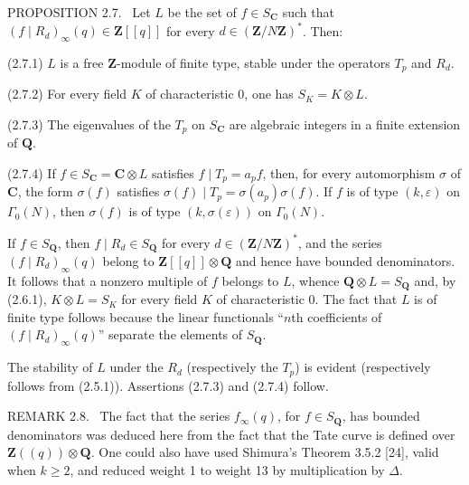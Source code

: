 \documentclass[10pt,oneside]{article}
\begin{document}
\noindent\textsc{PROPOSITION 2.7.} \textemdash\ Let \(L\) be the set of \(f\in S_{\mathbf{C}}\) such that \((f\mid R_d)_\infty(q)\in\mathbf{Z}[[q]]\) for every \(d\in(\mathbf{Z}/N\mathbf{Z})^*\). Then:\par

(2.7.1) \(L\) is a free \(\mathbf{Z}\)-module of finite type, stable under the operators \(T_p\) and \(R_d\).\par

(2.7.2) For every field \(K\) of characteristic 0, one has \(S_K=K\otimes L\).\par

(2.7.3) The eigenvalues of the \(T_p\) on \(S_{\mathbf{C}}\) are algebraic integers in a finite extension of \(\mathbf{Q}\).\par

(2.7.4) If \(f\in S_{\mathbf{C}}=\mathbf{C}\otimes L\) satisfies \(f\mid T_p=a_pf\), then, for every automorphism \(\sigma\) of \(\mathbf{C}\), the form \(\sigma(f)\) satisfies \(\sigma(f)\mid T_p=\sigma(a_p)\sigma(f)\). If \(f\) is of type \((k,\varepsilon)\) on \(\Gamma_0(N)\), then \(\sigma(f)\) is of type \((k,\sigma(\varepsilon))\) on \(\Gamma_0(N)\).\par

If \(f\in S_{\mathbf{Q}}\), then \(f\mid R_d\in S_{\mathbf{Q}}\) for every \(d\in(\mathbf{Z}/N\mathbf{Z})^*\), and the series \((f\mid R_d)_\infty(q)\) belong to \(\mathbf{Z}[[q]]\otimes\mathbf{Q}\) and hence have bounded denominators. It follows that a nonzero multiple of \(f\) belongs to \(L\), whence \(\mathbf{Q}\otimes L=S_{\mathbf{Q}}\) and, by (2.6.1), \(K\otimes L=S_K\) for every field \(K\) of characteristic 0. The fact that \(L\) is of finite type follows because the linear functionals “\(n\)th coefficients of \((f\mid R_d)_\infty(q)\)” separate the elements of \(S_{\mathbf{Q}}\).\par

The stability of \(L\) under the \(R_d\) (respectively the \(T_p\)) is evident (respectively follows from (2.5.1)). Assertions (2.7.3) and (2.7.4) follow.\par

\noindent\textsc{REMARK 2.8.} \textemdash\ The fact that the series \(f_\infty(q)\), for \(f\in S_{\mathbf{Q}}\), has bounded denominators was deduced here from the fact that the Tate curve is defined over \(\mathbf{Z}((q))\otimes\mathbf{Q}\). One could also have used Shimura's Theorem 3.5.2 [24], valid when \(k\geq 2\), and reduced weight 1 to weight 13 by multiplication by \(\Delta\).\par
\end{document}

